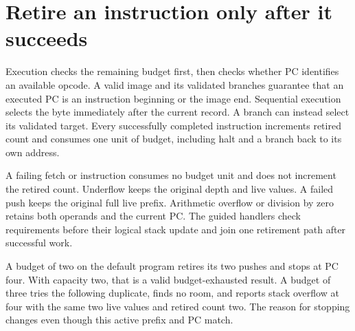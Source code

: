 \section{Retire an instruction only after it succeeds}\label{vm-retirement}
Execution checks the remaining budget first, then checks whether PC identifies an
available opcode. A valid image and its validated branches guarantee that an executed
PC is an instruction beginning or the image end. Sequential execution selects the
byte immediately after the current record. A branch can instead select its validated
target. Every successfully completed instruction increments retired count and consumes
one unit of budget, including halt and a branch back to its own address.

A failing fetch or instruction consumes no budget unit and does not increment the
retired count. Underflow keeps the original depth and live values. A failed push
keeps the original full live prefix. Arithmetic overflow or division by zero retains
both operands and the current PC. The guided handlers check requirements before their
logical stack update and join one retirement path after successful work.

A budget of two on the default program retires its two pushes and stops at PC four.
With capacity two, that is a valid budget-exhausted result. A budget of three tries
the following duplicate, finds no room, and reports stack overflow at four with the
same two live values and retired count two. The reason for stopping changes even
though this active prefix and PC match.

